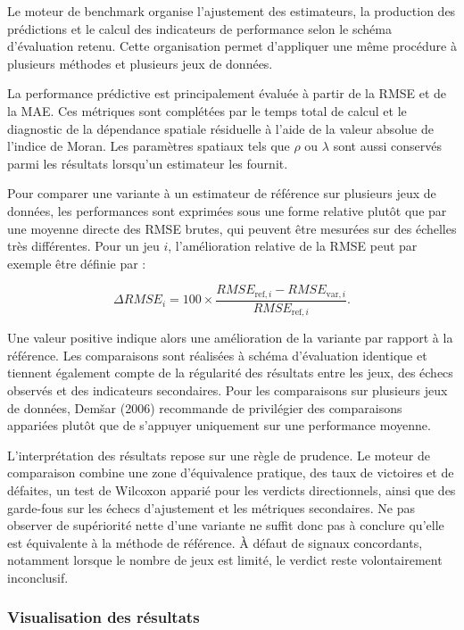 \documentclass[11pt,a4paper]{article}
\begin{document}
Le moteur de benchmark organise l'ajustement des estimateurs, la production des prédictions et le calcul des indicateurs de performance selon le schéma d'évaluation retenu. Cette organisation permet d'appliquer une même procédure à plusieurs méthodes et plusieurs jeux de données.


La performance prédictive est principalement évaluée à partir de la RMSE et de la MAE. Ces métriques sont complétées par le temps total de calcul et le diagnostic de la dépendance spatiale résiduelle à l'aide de la valeur absolue de l'indice de Moran. Les paramètres spatiaux tels que $\rho$ ou $\lambda$ sont aussi conservés parmi les résultats lorsqu'un estimateur les fournit.


Pour comparer une variante à un estimateur de référence sur plusieurs jeux de données, les performances sont exprimées sous une forme relative plutôt que par une moyenne directe des RMSE brutes, qui peuvent être mesurées sur des échelles très différentes. Pour un jeu $i$, l'amélioration relative de la RMSE peut par exemple être définie par :

\begin{equation}
    \Delta RMSE_i
    =
    100
    \times
    \frac{RMSE_{\mathrm{ref},i}-RMSE_{\mathrm{var},i}}
         {RMSE_{\mathrm{ref},i}}.
\end{equation}

Une valeur positive indique alors une amélioration de la variante par rapport à la référence. Les comparaisons sont réalisées à schéma d'évaluation identique et tiennent également compte de la régularité des résultats entre les jeux, des échecs observés et des indicateurs secondaires. Pour les comparaisons sur plusieurs jeux de données, Demšar (2006) recommande de privilégier des comparaisons appariées plutôt que de s'appuyer uniquement sur une performance moyenne.

L'interprétation des résultats repose sur une règle de prudence. Le moteur de comparaison combine une zone d'équivalence pratique, des taux de victoires et de défaites, un test de Wilcoxon apparié pour les verdicts directionnels, ainsi que des garde-fous sur les échecs d'ajustement et les métriques secondaires. Ne pas observer de supériorité nette d'une variante ne suffit donc pas à conclure qu'elle est équivalente à la méthode de référence. À défaut de signaux concordants, notamment lorsque le nombre de jeux est limité, le verdict reste volontairement inconclusif.

\subsubsection{Visualisation des résultats}
\end{document}
